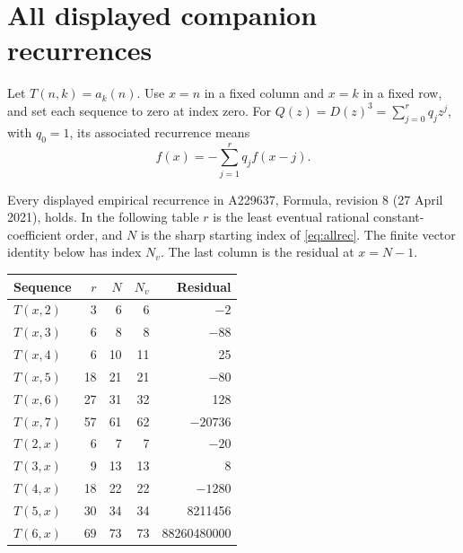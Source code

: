 \section{All displayed companion recurrences}
Let $T(n,k)=a_k(n)$. Use $x=n$ in a fixed column and $x=k$ in a
fixed row, and set each sequence to zero at index zero.
For $Q(z)=D(z)^3=\sum_{j=0}^{r}q_jz^j$, with $q_0=1$, its
associated recurrence means
\begin{equation}\label{eq:allrec}
f(x)=-\sum_{j=1}^{r}q_j f(x-j).
\end{equation}
\begin{corollary}\label{cor:all}
Every displayed empirical recurrence in A229637, Formula, revision 8
(27 April 2021), holds. In the following table $r$ is the least
eventual rational constant-coefficient order, and $N$ is the sharp
starting index of \eqref{eq:allrec}. The finite vector identity below
has index $N_v$. The last column is the residual at $x=N-1$.
\end{corollary}
\begin{center}\small
\begin{tabular}{lrrrr}
\toprule
Sequence&$r$&$N$&$N_v$&Residual\\
\midrule
$T(x,2)$&3&6&6&$-2$\\
$T(x,3)$&6&8&8&$-88$\\
$T(x,4)$&6&10&11&25\\
$T(x,5)$&18&21&21&$-80$\\
$T(x,6)$&27&31&32&128\\
$T(x,7)$&57&61&62&$-20736$\\
\midrule
$T(2,x)$&6&7&7&$-20$\\
$T(3,x)$&9&13&13&8\\
$T(4,x)$&18&22&22&$-1280$\\
$T(5,x)$&30&34&34&8211456\\
$T(6,x)$&69&73&73&88260480000\\
\bottomrule
\end{tabular}
\end{center}
